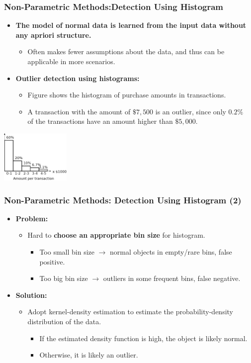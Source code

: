 \begin{frame}
  \frametitle{Non-Parametric Methods:Detection Using Histogram}
  \begin{itemize}
  \item \textbf{The model of normal data is learned from the input data without any apriori structure.}
    \begin{itemize}
    \item Often makes fewer assumptions about the data, and thus can be applicable in more scenarios.
    \end{itemize}
  \item \textbf{Outlier detection using histograms:}
    \begin{itemize}
    \item Figure shows the histogram of purchase amounts in transactions.
    \item A transaction with the amount of $\$7,500$ is an outlier, since only $0.2\%$ \\ of the transactions have an amount higher than $\$5,000$.
    \end{itemize}
  \end{itemize}
  \centering
  \vspace{0.2cm}
  \includegraphics[width=0.25\textwidth]{img/histogram8.png}
\end{frame}


\begin{frame}
  \frametitle{Non-Parametric Methods: Detection Using Histogram (2)}
  \begin{itemize}
  \item \textbf{Problem:}
    \begin{itemize}
    \item Hard to \textbf{\color{airforceblue}choose an appropriate bin size} for histogram.
      \begin{itemize}
      \item Too small bin size $\rightarrow$ normal objects in empty/rare bins, false positive.
      \item Too big bin size $\rightarrow$ outliers in some frequent bins, false negative.
      \end{itemize}
    \end{itemize}
  \item \textbf{Solution:}
    \begin{itemize}
    \item Adopt kernel-density estimation to estimate the probability-density distribution of the data.
      \begin{itemize}
      \item If the estimated density function is high, the object is likely normal.
      \item Otherwise, it is likely an outlier.
      \end{itemize}
    \end{itemize}
  \end{itemize}
\end{frame}
